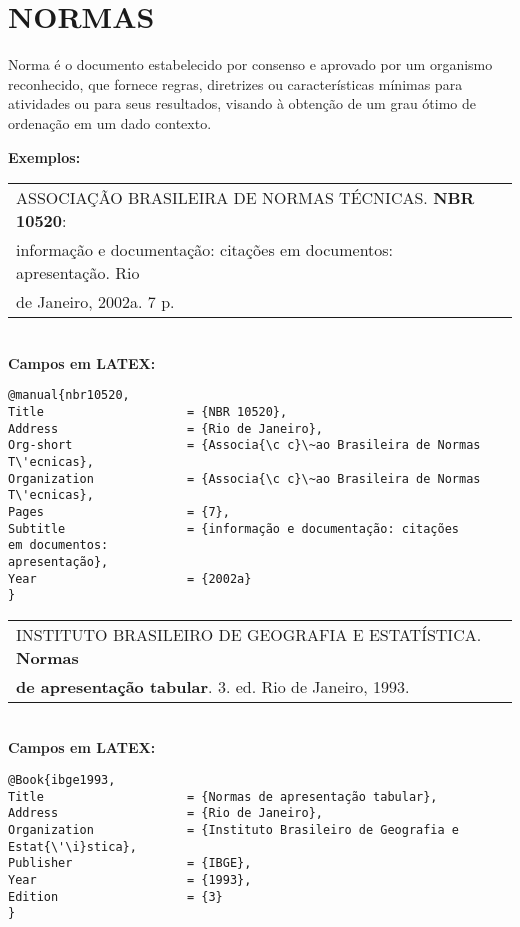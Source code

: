 \section{NORMAS}
	
Norma é o documento estabelecido por consenso e aprovado por um organismo reconhecido, que fornece regras, diretrizes ou características mínimas para atividades ou para seus resultados, visando à obtenção de um grau ótimo de ordenação em um dado contexto.
	
\textbf{Exemplos:} \\
	
\begin{tabular}{|l|c|} \hline
	ASSOCIAÇÃO BRASILEIRA DE NORMAS TÉCNICAS. \textbf{NBR 10520}: \\informação e documentação: citações em documentos: apresentação. Rio \\de Janeiro, 2002a. 7 p. 
	                                                                 \\\hline
\end{tabular} \\
	
\textbf{Campos em LATEX:} 
	
\begingroup
\fontsize{10pt}{12pt}\selectfont
\begin{verbatim}
@manual{nbr10520,
Title                    = {NBR 10520},
Address                  = {Rio de Janeiro},
Org-short                = {Associa{\c c}\~ao Brasileira de Normas 
T\'ecnicas},
Organization             = {Associa{\c c}\~ao Brasileira de Normas 
T\'ecnicas},
Pages                    = {7},
Subtitle                 = {informação e documentação: citações 
em documentos: 
apresentação},
Year                     = {2002a}
}

\end{verbatim}
\endgroup
	
\begin{tabular}{|l|c|} \hline
	INSTITUTO BRASILEIRO DE GEOGRAFIA E ESTATÍSTICA. \textbf{Normas} \\ \textbf{de apresentação tabular}. 3. ed. Rio de Janeiro, 1993. 
	                                                                  \\\hline
\end{tabular} \\
	
\textbf{Campos em LATEX:} 
	
\begingroup
\fontsize{10pt}{12pt}\selectfont
\begin{verbatim}
@Book{ibge1993,
Title                    = {Normas de apresentação tabular},
Address                  = {Rio de Janeiro},
Organization             = {Instituto Brasileiro de Geografia e 
Estat{\'\i}stica},
Publisher                = {IBGE},
Year                     = {1993},
Edition                  = {3}
}

\end{verbatim}
\endgroup
